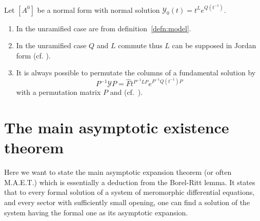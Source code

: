 \begin{rem}
  Let $[A^0]$ be a normal form with normal solution
  $\mathcal{Y}_0(t)=t^L e^{Q(t^{-1})}$.
  \begin{enumerate}
    \item In the unramified case are  from definition~\ref{defn:model}.
    \item In the unramified case $Q$ and $L$ commute thus $L$ can be supposed
      in Jordan form (cf.  \cite[Sec.4]{Martinet1991}).
    \item It is always possible to permutate the columns of a fundamental
      solution by
      \[
        P^{-1}\mathcal{Y}P=\hat F t^{P^{-1}LP} e^{P^{-1}Q(t^{-1})P}
      \]
      with a permutation matrix $P$ and  (cf.\ \cite[73]{Loday2014}).
  \end{enumerate}
\end{rem}

\section{The main asymptotic existence theorem}
\TODO[move] 
\begin{comment}
  \begin{multicols}{2}
    \textbf{Classical:}
    \begin{itemize}
      \item \cite[Thm.4.4.1]{Loday2014}
      \item \cite[Thm.7.10]{van2003galois}{\tiny\cite[Thm.7.12]{van2003galois}}
      \item \cite[Thm.12.1]{wasow2002asymptotic}
      \item \cite[5.3.Thm.1]{Varadarajan96linearmeromorphic}
      \item \cite[207]{Balser2000Formal}: Some historical remarks
    \end{itemize}
  \columnbreak
    \textbf{Sheafical:}
    \begin{itemize}
      \item \cite[Thm.2.3.1]{sabbah_cimpa90}
      \item \cite[Sec.4.4]{Loday2014}
    \end{itemize}
  \end{multicols}
\end{comment}
Here we want to state the main asymptotic expansion theorem (or often M.A.E.T.)
which is essentially a deduction from the Borel-Ritt lemma.
It states that to every formal solution of a system of meromorphic differential
equations, and every sector with sufficiently small opening, one can find a
solution of the system having the formal one as its asymptotic expansion.

